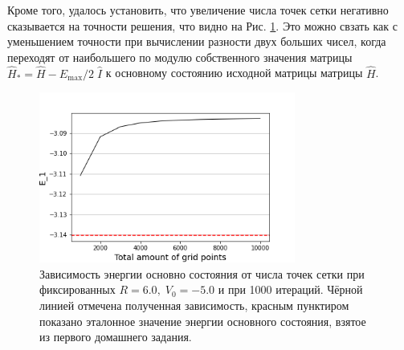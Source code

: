 \documentclass[10pt]{article}
\begin{document}
Кроме того, удалось установить, что увеличение числа точек сетки негативно сказывается на точности решения, что видно на Рис. \ref{fig:e1_vs_m}. Это можно свзать как с уменьшением точности при вычислении разности двух больших чисел, когда переходят от наибольшего по модулю собственного значения матрицы $\hat H_* = \hat H - E_\textrm{max}/2\; \hat I$ к основному состоянию исходной матрицы матрицы $\hat H$.
\begin{figure}[htbp]
 \centering
 \includegraphics[width=0.75\textwidth]{../figures/e1_vs_m}
 \caption{Зависимость энергии основно состояния от числа точек сетки при фиксированных $R=6.0,\; V_0 = -5.0$ и при 1000 итераций. Чёрной линией отмечена полученная зависимость, красным пунктиром показано эталонное значение энергии основного состояния, взятое из первого домашнего задания.}
 \label{fig:e1_vs_m}
\end{figure}
\end{document}

